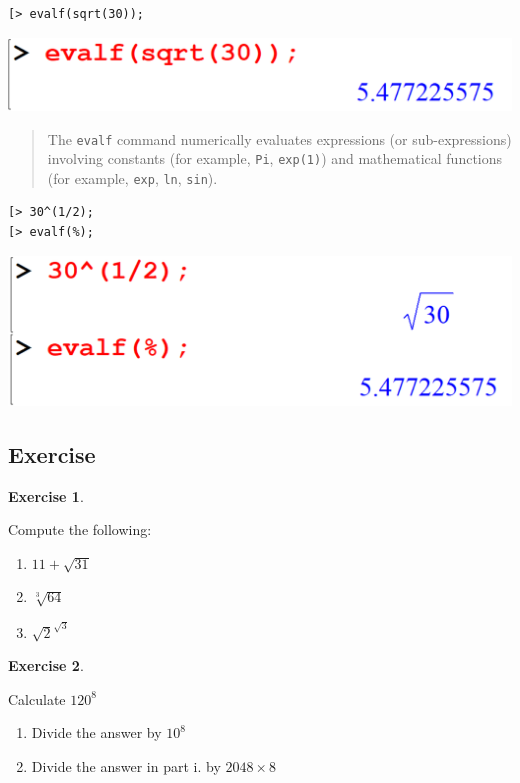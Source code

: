 \documentclass[
]{book}
\providecommand{\tightlist}{%
  \setlength{\itemsep}{0pt}\setlength{\parskip}{0pt}}
\theoremstyle{definition}
\theoremstyle{definition}
\theoremstyle{definition}
\newtheorem{exercise}{Exercise}[chapter]
\theoremstyle{definition}
\theoremstyle{remark}
\begin{document}
\begin{verbatim}
[> evalf(sqrt(30));
\end{verbatim}

\includegraphics{figures/Lesson 1/fig29.png}

\begin{quote}
The \texttt{evalf} command numerically evaluates expressions (or sub-expressions) involving constants (for example, \texttt{Pi}, \texttt{exp(1)}) and mathematical functions (for example, \texttt{exp}, \texttt{ln}, \texttt{sin}).
\end{quote}

\begin{verbatim}
[> 30^(1/2);
[> evalf(%);
\end{verbatim}

\includegraphics{figures/Lesson 1/fig30.png}

\subsection{Exercise}\label{exercise-11}

\begin{exercise}
\protect\hypertarget{exr:unnamed-chunk-64}{}\label{exr:unnamed-chunk-64}

Compute the following:

\begin{enumerate}
\def\labelenumi{\roman{enumi}.}
\tightlist
\item
  \(11 + \sqrt{31}\)
\item
  \(\sqrt[3]{64}\)
\item
  \(\sqrt{2}^{\sqrt{3}}\)
\end{enumerate}

\end{exercise}

\begin{exercise}
\protect\hypertarget{exr:unnamed-chunk-65}{}\label{exr:unnamed-chunk-65}

Calculate \(120^8\)

\begin{enumerate}
\def\labelenumi{\roman{enumi}.}
\tightlist
\item
  Divide the answer by \(10^8\)
\item
  Divide the answer in part i. by \(2048 \times 8\)
\end{enumerate}

\end{exercise}
\end{document}

